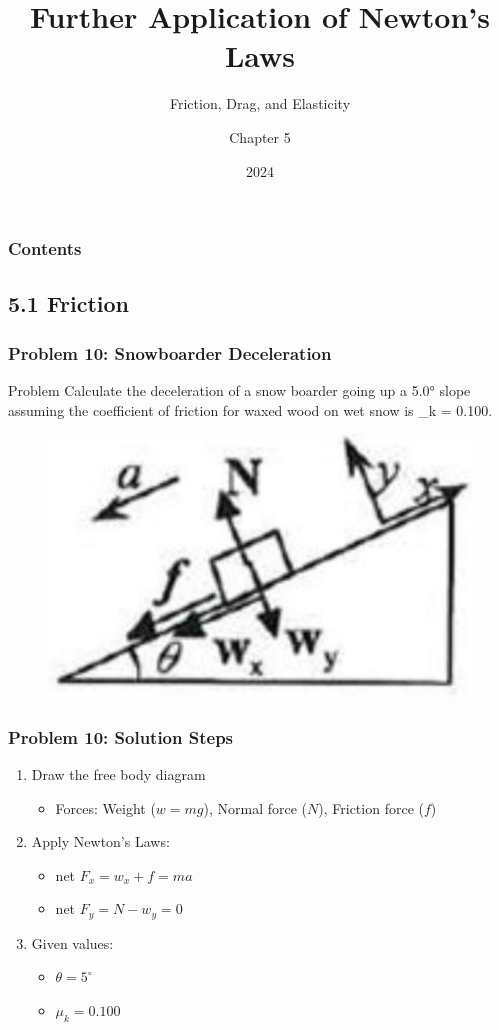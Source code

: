 \documentclass{beamer}
\title{Further Application of Newton's Laws}
\subtitle{Friction, Drag, and Elasticity}
\author{Chapter 5}
\date{2024}
\begin{document}
\frame{\titlepage}

\begin{frame}
\frametitle{Contents}
\tableofcontents
\end{frame}

\subsection{5.1 Friction}
\begin{frame}
\frametitle{Problem 10: Snowboarder Deceleration}
\begin{block}{Problem}
Calculate the deceleration of a snow boarder going up a 5.0° slope assuming the coefficient of friction for waxed wood on wet snow is \mu_k = 0.100.
\end{block}

\begin{figure}[H]
    \centering
    \includegraphics[width=0.5\linewidth]{Screenshot 2024-10-29 103504.png}
\end{figure}
\end{frame}

\begin{frame}
\frametitle{Problem 10: Solution Steps}
\begin{enumerate}
\item Draw the free body diagram
    \begin{itemize}
    \item Forces: Weight ($w = mg$), Normal force ($N$), Friction force ($f$)
    \end{itemize}
\item Apply Newton's Laws:
    \begin{itemize}
    \item net $F_x = w_x + f = ma$
    \item net $F_y = N - w_y = 0$
    \end{itemize}
\item Given values:
    \begin{itemize}
    \item $\theta = 5^\circ$
    \item $\mu_k = 0.100$
    \end{itemize}
\end{enumerate}
\end{frame}
\end{document}
